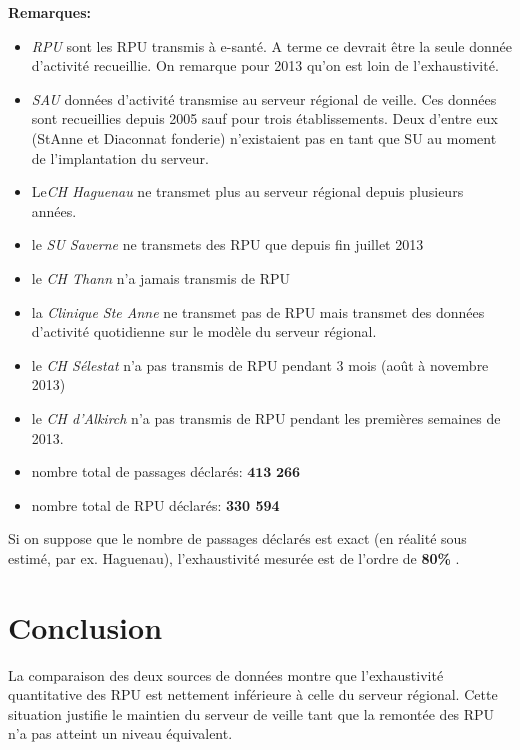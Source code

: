 \documentclass{article}\usepackage[]{graphicx}\usepackage[]{color}
\begin{document}
\textbf{Remarques:}
\begin{itemize}
  \item \emph{RPU} sont les RPU transmis à e-santé. A terme ce devrait être la seule donnée d'activité recueillie. On remarque pour 2013 qu'on est loin de l'exhaustivité.
  \item \emph{SAU} données d'activité transmise au serveur régional de veille. Ces données sont recueillies depuis 2005 sauf pour trois établissements. Deux d'entre eux (StAnne et Diaconnat fonderie) n'existaient pas en tant que SU au moment de l'implantation du serveur.
  \item Le\emph{CH Haguenau} ne transmet plus au serveur régional depuis plusieurs années.
  \item le \emph{SU Saverne} ne transmets des RPU que depuis fin juillet 2013
  \item le \emph{CH Thann} n'a jamais transmis de RPU
  \item la \emph{Clinique Ste Anne} ne transmet pas de RPU mais transmet des données d'activité quotidienne sur le modèle du serveur régional.
  \item le \emph{CH Sélestat} n'a pas transmis de RPU pendant 3 mois (août à novembre 2013)
  \item le \emph{CH d'Alkirch} n'a pas transmis de RPU pendant les premières semaines de 2013.
\end{itemize}


\begin{center}
\begin{boxedminipage}{10cm}
 \begin{itemize}
  \item nombre total de passages déclarés: $\textbf{413 266}$ 
  \item nombre total de RPU déclarés: \textbf{330 594}
 \end{itemize}
\end{boxedminipage}
\end{center}

Si on suppose que le nombre de passages déclarés est exact (en réalité sous estimé, par ex. Haguenau), l'exhaustivité mesurée est de l'ordre de \textbf{80\%} .

\section{Conclusion}

La comparaison des deux sources de données montre que l'exhaustivité quantitative des RPU est nettement inférieure à celle du serveur régional. Cette situation justifie le maintien du serveur de veille tant que la remontée des RPU n'a pas atteint un niveau équivalent.
\end{document}
